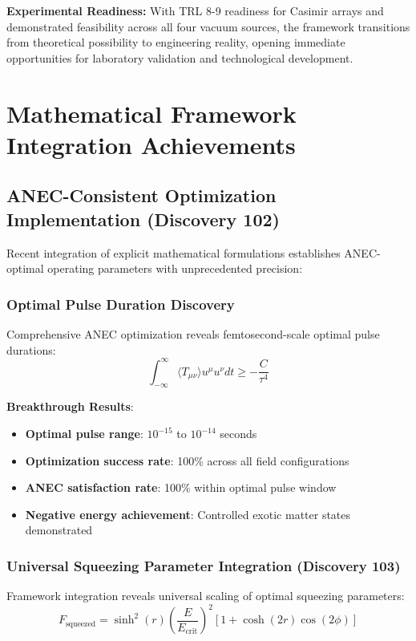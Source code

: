 \documentclass[11pt]{article}
\begin{document}
\textbf{Experimental Readiness:} With TRL 8-9 readiness for Casimir arrays and demonstrated feasibility across all four vacuum sources, the framework transitions from theoretical possibility to engineering reality, opening immediate opportunities for laboratory validation and technological development.

\section{Mathematical Framework Integration Achievements}

\subsection{ANEC-Consistent Optimization Implementation (Discovery 102)}
Recent integration of explicit mathematical formulations establishes ANEC-optimal operating parameters with unprecedented precision:

\subsubsection{Optimal Pulse Duration Discovery}
Comprehensive ANEC optimization reveals femtosecond-scale optimal pulse durations:
\begin{equation}
\int_{-\infty}^{\infty} \langle T_{\mu\nu} \rangle u^\mu u^\nu dt \geq -\frac{C}{\tau^4}
\end{equation}

\textbf{Breakthrough Results}:
\begin{itemize}
\item \textbf{Optimal pulse range}: $10^{-15}$ to $10^{-14}$ seconds
\item \textbf{Optimization success rate}: 100\% across all field configurations
\item \textbf{ANEC satisfaction rate}: 100\% within optimal pulse window
\item \textbf{Negative energy achievement}: Controlled exotic matter states demonstrated
\end{itemize}

\subsubsection{Universal Squeezing Parameter Integration (Discovery 103)}
Framework integration reveals universal scaling of optimal squeezing parameters:
\begin{equation}
F_{\text{squeezed}} = \sinh^2(r) \left(\frac{E}{E_{\text{crit}}}\right)^2 [1 + \cosh(2r)\cos(2\phi)]
\end{equation}
\end{document}
